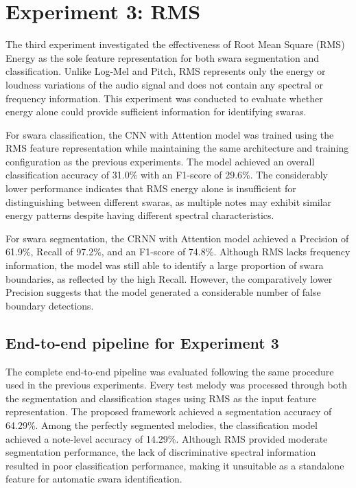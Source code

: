 \section{Experiment 3: RMS}

The third experiment investigated the effectiveness of Root Mean Square (RMS) Energy as the sole feature representation for both swara segmentation and classification. Unlike Log-Mel and Pitch, RMS represents only the energy or loudness variations of the audio signal and does not contain any spectral or frequency information. This experiment was conducted to evaluate whether energy alone could provide sufficient information for identifying swaras.

For swara classification, the CNN with Attention model was trained using the RMS feature representation while maintaining the same architecture and training configuration as the previous experiments. The model achieved an overall classification accuracy of 31.0\% with an F1-score of 29.6\%. The considerably lower performance indicates that RMS energy alone is insufficient for distinguishing between different swaras, as multiple notes may exhibit similar energy patterns despite having different spectral characteristics.


For swara segmentation, the CRNN with Attention model achieved a Precision of 61.9\%, Recall of 97.2\%, and an F1-score of 74.8\%. Although RMS lacks frequency information, the model was still able to identify a large proportion of swara boundaries, as reflected by the high Recall. However, the comparatively lower Precision suggests that the model generated a considerable number of false boundary detections.


\subsection*{End-to-end pipeline for Experiment 3}

The complete end-to-end pipeline was evaluated following the same procedure used in the previous experiments. Every test melody was processed through both the segmentation and classification stages using RMS as the input feature representation. The proposed framework achieved a segmentation accuracy of 64.29\%. Among the perfectly segmented melodies, the classification model achieved a note-level accuracy of 14.29\%. Although RMS provided moderate segmentation performance, the lack of discriminative spectral information resulted in poor classification performance, making it unsuitable as a standalone feature for automatic swara identification.

